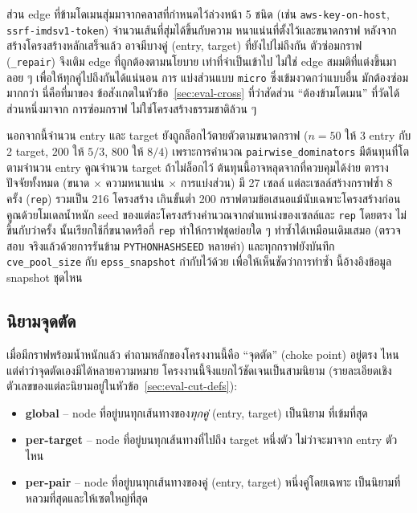 ส่วน edge ที่ข้ามโดเมนสุ่มมาจากคลาสที่กำหนดไว้ล่วงหน้า 5 ชนิด (เช่น
\texttt{aws-key-on-host}, \texttt{ssrf-imdsv1-token}) จำนวนเส้นที่สุ่มได้ขึ้นกับความ
หนาแน่นที่ตั้งไว้และขนาดกราฟ หลังจากสร้างโครงสร้างหลักเสร็จแล้ว อาจมีบางคู่ (entry,
target) ที่ยังไปไม่ถึงกัน ตัวซ่อมกราฟ (\texttt{\_repair}) จึงเติม edge ที่ถูกต้องตามนโยบาย
เท่าที่จำเป็นเข้าไป ไม่ใช่ edge สมมติที่แต่งขึ้นมาลอย ๆ เพื่อให้ทุกคู่ไปถึงกันได้แน่นอน การ
แบ่งส่วนแบบ \texttt{micro} ซึ่งเข้มงวดกว่าแบบอื่น มักต้องซ่อมมากกว่า นี่คือที่มาของ
ข้อสังเกตในหัวข้อ~\ref{sec:eval-cross} ที่ว่าสัดส่วน ``ต้องข้ามโดเมน'' ที่วัดได้ส่วนหนึ่งมาจาก
การซ่อมกราฟ ไม่ใช่โครงสร้างธรรมชาติล้วน ๆ

นอกจากนี้จำนวน entry และ target ยังถูกล็อกไว้ตายตัวตามขนาดกราฟ ($n{=}50$ ให้ 3
entry กับ 2 target, $200$ ให้ $5/3$, $800$ ให้ $8/4$) เพราะการคำนวณ
\texttt{pairwise\_dominators} มีต้นทุนที่โตตามจำนวน entry คูณจำนวน target ถ้าไม่ล็อกไว้
ต้นทุนนี้อาจหลุดจากที่ควบคุมได้ง่าย ตารางปัจจัยทั้งหมด (ขนาด $\times$ ความหนาแน่น $\times$
การแบ่งส่วน) มี 27 เซลล์ แต่ละเซลล์สร้างกราฟซ้ำ 8 ครั้ง (\texttt{rep}) รวมเป็น 216
โครงสร้าง เกินขั้นต่ำ 200 กราฟตามข้อเสนอแม้นับเฉพาะโครงสร้างก่อนคูณด้วยโมเดลน้ำหนัก
seed ของแต่ละโครงสร้างคำนวณจากตำแหน่งของเซลล์และ \texttt{rep} โดยตรง ไม่ขึ้นกับว่าครั้ง
นั้นเรียกใช้กี่ขนาดหรือกี่ \texttt{rep} ทำให้กราฟชุดย่อยใด ๆ ทำซ้ำได้เหมือนเดิมเสมอ (ตรวจสอบ
จริงแล้วด้วยการรันข้าม \texttt{PYTHONHASHSEED} หลายค่า) และทุกกราฟยังบันทึก
\texttt{cve\_pool\_size} กับ \texttt{epss\_snapshot} กำกับไว้ด้วย เพื่อให้เห็นชัดว่าการทำซ้ำ
นี้อ้างอิงข้อมูล snapshot ชุดไหน

\subsection{นิยามจุดตัด}\label{sec:design-chokepoint}

เมื่อมีกราฟพร้อมน้ำหนักแล้ว คำถามหลักของโครงงานนี้คือ ``จุดตัด'' (choke point) อยู่ตรง
ไหน แต่คำว่าจุดตัดเองมีได้หลายความหมาย โครงงานนี้จึงแยกไว้ชัดเจนเป็นสามนิยาม
(รายละเอียดเชิงตัวเลขของแต่ละนิยามอยู่ในหัวข้อ~\ref{sec:eval-cut-defs}):

\begin{itemize}[leftmargin=1.6em]
\item \textbf{global} -- node ที่อยู่บนทุกเส้นทางของ\emph{ทุกคู่} (entry, target) เป็นนิยาม
ที่เข้มที่สุด
\item \textbf{per-target} -- node ที่อยู่บนทุกเส้นทางที่ไปถึง target หนึ่งตัว ไม่ว่าจะมาจาก
entry ตัวไหน
\item \textbf{per-pair} -- node ที่อยู่บนทุกเส้นทางของคู่ (entry, target) หนึ่งคู่โดยเฉพาะ
เป็นนิยามที่หลวมที่สุดและให้เซตใหญ่ที่สุด
\end{itemize}

